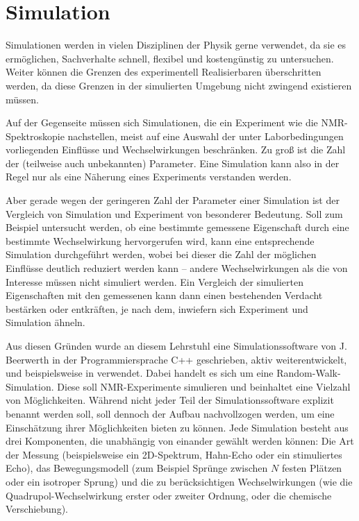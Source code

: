 \chapter{Simulation}\label{chapter:simulation}

Simulationen werden in vielen Disziplinen der Physik gerne verwendet, da sie es ermöglichen, Sachverhalte schnell, flexibel und kostengünstig zu untersuchen. Weiter können die Grenzen des experimentell Realisierbaren überschritten werden, da diese Grenzen in der simulierten Umgebung nicht zwingend existieren müssen.

Auf der Gegenseite müssen sich Simulationen, die ein Experiment wie die NMR-Spektroskopie nachstellen, meist auf eine Auswahl der unter Laborbedingungen vorliegenden Einflüsse und Wechselwirkungen beschränken. Zu groß ist die Zahl der (teilweise auch unbekannten) Parameter. Eine Simulation kann also in der Regel nur als eine Näherung eines Experiments verstanden werden.

Aber gerade wegen der geringeren Zahl der Parameter einer Simulation ist der Vergleich von Simulation und Experiment von besonderer Bedeutung. Soll zum Beispiel untersucht werden, ob eine bestimmte gemessene Eigenschaft durch eine bestimmte Wechselwirkung hervorgerufen wird, kann eine entsprechende Simulation durchgeführt werden, wobei bei dieser die Zahl der möglichen Einflüsse deutlich reduziert werden kann -- andere Wechselwirkungen als die von Interesse müssen nicht simuliert werden. Ein Vergleich der simulierten Eigenschaften mit den gemessenen kann dann einen bestehenden Verdacht bestärken oder entkräften, je nach dem, inwiefern sich Experiment und Simulation ähneln.


Aus diesen Gründen wurde an diesem Lehrstuhl eine Simulationssoftware von J. Beerwerth in der Programmiersprache C++ geschrieben, aktiv weiterentwickelt, und beispielsweise in \cite{joachim_master} verwendet. Dabei handelt es sich um eine Random-Walk-Simulation. Diese soll NMR-Experimente simulieren und beinhaltet eine Vielzahl von Möglichkeiten. Während nicht jeder Teil der Simulationssoftware explizit benannt werden soll, soll dennoch der Aufbau nachvollzogen werden, um eine Einschätzung ihrer Möglichkeiten bieten zu können. Jede Simulation besteht aus drei Komponenten, die unabhängig von einander gewählt werden können: Die Art der Messung (beispielsweise ein 2D-Spektrum, Hahn-Echo oder ein stimuliertes Echo), das Bewegungsmodell (zum Beispiel Sprünge zwischen $N$ festen Plätzen oder ein isotroper Sprung) und die zu berücksichtigen Wechselwirkungen (wie die Quadrupol-Wechselwirkung erster oder zweiter Ordnung, oder die chemische Verschiebung).

